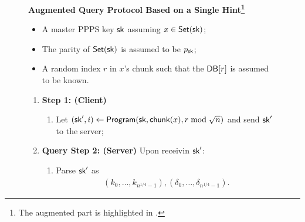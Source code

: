\begin{figure}
    
    \begin{minipage}{\textwidth}
        \begin{mdframed}
            \label{alg:one-query}
            \begin{center}
                {\bf Augmented Query Protocol Based on a Single Hint\footnote{The augmented part is highlighted in .}
                }
            \end{center}
            
            \begin{itemize}
                \item A master PPPS key $\mathsf{sk}$ assuming $x\in \mathsf{Set}(\mathsf{sk})$;
                \item The parity of $\mathsf{Set}(\mathsf{sk})$ is assumed to be $p_{\mathsf{sk}}$;
                \item A random index $r$ in $x$'s chunk such that the  $\mathsf{DB}[r]$
                is assumed to be known.
            \end{itemize}
            
            \begin{enumerate}[leftmargin=5mm,itemsep=1pt]
                \item 
                {\bf Step 1: (Client)}
                
                \begin{enumerate}[leftmargin=5mm,itemsep=1pt]
                    
                    \item Let $(\mathsf{sk}', i)\leftarrow \mathsf{Program}(\mathsf{sk}, \mathsf{chunk}(x), r \bmod \sqrt{n})$ and send $\mathsf{sk}'$ to the server;
                    
                    
                \end{enumerate}
                
                \newpage
                
                \item 
                {\bf Query Step 2: (Server)}             
                Upon receivin $\mathsf{sk}'$: 
                \begin{enumerate}
                    \item Parse $\mathsf{sk}'$ as  
                    \begin{align*}
                        (k_{0},\dots,k_{n^{1/4}-1}),
                        (\delta_{0},\dots,\delta_{n^{1/4}-1}).
                    \end{align*}
                    

\end{enumerate}
\end{enumerate}
\end{mdframed}
\end{minipage}
\end{figure}
